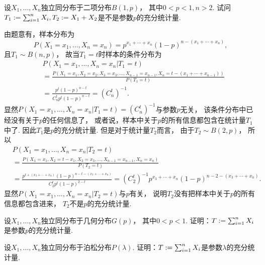 \begin{example}
设\(X_1,\dotsc,X_n\)独立同分布于二项分布\(B(1,p)\)，
其中\(0<p<1,n>2\).
试问\(
	T_1 := \sum_{i=1}^n X_i,
	T_2 := X_1 + X_2
\)是不是参数\(p\)的充分统计量.
\begin{solution}
由题意有，样本分布为\begin{equation*}
	P(X_1=x_1,\dotsc,X_n=x_n)
	= p^{x_1+\dotsb+x_n}
	(1-p)^{n-(x_1+\dotsb+x_n)},
\end{equation*}
且\(T_1 \sim B(n,p)\)，
故当\(T_1 = t\)时样本的条件分布为\begin{align*}
	&P(X_1=x_1,\dotsc,X_n=x_n \vert T_1 = t) \\
	&= \frac{
		P\left(
			X_1=x_1,
			X_2=x_2,
			X_3=x_3,
			\dotsc,
			X_{n-1}=x_{n-1},
			X_n=t-(x_1+\dotsb+x_{n-1})
		\right)
	}{
		P(T_1=t)
	} \\
	&= \frac{p^t (1-p)^{n-t}}{C_n^t p^t (1-p)^{n-t}}
	= (C_n^t)^{-1}.
\end{align*}
显然\(P(X_1=x_1,\dotsc,X_n=x_n \vert T_1 = t) = (C_n^t)^{-1}\)与参数\(p\)无关，
该条件分布中已经没有关于\(p\)的任何信息了，
或者说，样本中关于\(p\)的所有信息都包含在统计量\(T_1\)中了.
因此\(T_1\)是\(p\)的充分统计量.
但是对于统计量\(T_2\)而言，
由于\(T_2 \sim B(2,p)\)，
所以\begin{align*}
	&P(X_1=x_1,\dotsc,X_n=x_n \vert T_2 = t) \\
	&= \frac{
		P\left(
			X_1=x_1,
			X_2=t-x_1,
			X_3=x_3,
			\dotsc,
			X_{n-1}=x_{n-1},
			X_n=x_n
		\right)
	}{
		P(T_2=t)
	} \\
	&= \frac{
		p^{t+(x_3+\dotsb+x_n)}
		(1-p)^{n-t-(x_3+\dotsb+x_n)}
	}{
		C_2^t p^t (1-p)^{2-t}
	}
	= (C_2^t)^{-1} p^{x_3+\dotsb+x_n} (1-p)^{n-2-(x_3+\dotsb+x_n)}.
\end{align*}
显然\(P(X_1=x_1,\dotsc,X_n=x_n \vert T_2 = t)\)与\(p\)有关，
说明\(T_2\)没有把样本中关于\(p\)的所有信息都包含进来，
\(T_2\)不是\(p\)的充分统计量.
\end{solution}
\end{example}

\begin{example}
设\(X_1,\dotsc,X_n\)独立同分布于几何分布\(G(p)\)，
其中\(0<p<1\).
证明：\(T := \sum_{i=1}^n X_i\)是参数\(p\)的充分统计量.
\end{example}

\begin{example}
设\(X_1,\dotsc,X_n\)独立同分布于泊松分布\(P(\lambda)\).
证明：\(T := \sum_{i=1}^n X_i\)是参数\(\lambda\)的充分统计量.
\end{example}

